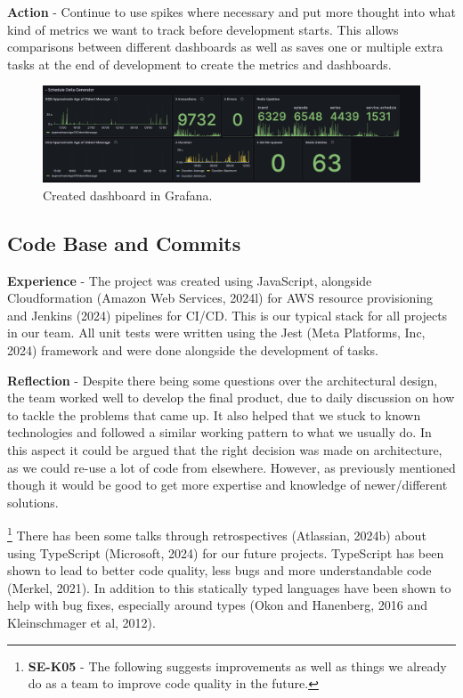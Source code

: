   \vspace{0.2cm}
  \textbf{Action} - Continue to use spikes where necessary and put more thought into what kind of metrics we want to track before development starts.
  This allows comparisons between different dashboards as well as saves one or multiple extra tasks at the end of development to create the metrics and
  dashboards.

  \begin{figure}[H]
    \centering
    \includegraphics[width=12cm]{assets/outputs/dashboard.png}
    \caption{Created dashboard in Grafana.}
    \label{fig:dashboard}
  \end{figure}
  
  \newpage
  \subsection{Code Base and Commits}

  \textbf{Experience} - The project was created using JavaScript, alongside Cloudformation (Amazon Web Services, 2024l) for AWS resource provisioning and 
  Jenkins (2024) pipelines for CI/CD. This is our typical stack for all projects in our team. All unit tests were written using the Jest 
  (Meta Platforms, Inc, 2024) framework and were done alongside the development of tasks.

  \vspace{0.2cm}
  \textbf{Reflection} - Despite there being some questions over the architectural design, the team worked well to develop the final product, due to daily 
  discussion on how to tackle the problems that came up. It also helped that we stuck to known technologies and followed a similar working pattern to what 
  we usually do. In this aspect it could be argued that the right decision was made on architecture, as we could re-use a lot of code from elsewhere.
  However, as previously mentioned though it would be good to get more expertise and knowledge of newer/different solutions.

  \footnote{\textbf{SE-K05} - The following suggests improvements as well as things we already do as a team to improve code quality in the future.}
  There has been some talks through retrospectives (Atlassian, 2024b) about using TypeScript (Microsoft, 2024) for our future projects. TypeScript has been 
  shown to lead to better code quality, less bugs and more understandable code (Merkel, 2021). In addition to this statically typed languages have been shown
  to help with bug fixes, especially around types (Okon and Hanenberg, 2016 and Kleinschmager et al, 2012).

